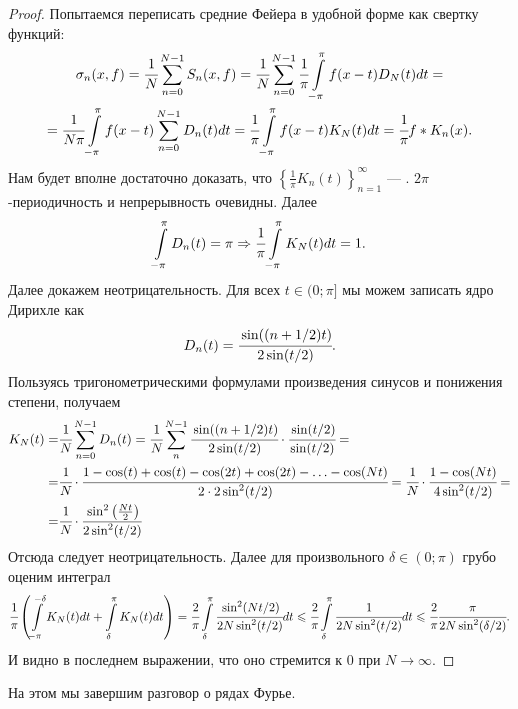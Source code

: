 	\begin{proof}
		Попытаемся переписать средние Фейера в удобной форме как свертку функций:
        \begin{multline}	
			\sigma_n(x,f) = \cfrac{1}{N}\sum\limits_{n=0}^{N-1}S_n(x,f) = \cfrac{1}{N}\sum\limits_{n=0}^{N-1}\cfrac{1}{\pi}\int\limits_{-\pi}^{\pi}f(x-t)D_N(t)dt = \\ 
            = \cfrac{1}{N\pi}\int\limits_{-\pi}^{\pi}f(x-t)\sum\limits_{n=0}^{N-1}D_n(t)dt =   \cfrac{1}{\pi}\int\limits_{-\pi}^{\pi}f(x-t)K_N(t)dt = \cfrac{1}{\pi}f*K_n(x).
        \end{multline}
		Нам будет вполне достаточно доказать, что $\left\{\frac{1}{\pi}K_n(t)\right\}_{n=1}^{\infty}$ --- \lmao. 
		$2\pi$-периодичность и непрерывность очевидны. Далее
		$$
			\int\limits_{-\pi}^{\pi}D_n(t) = \pi \Rightarrow \cfrac{1}{\pi} \int\limits_{-\pi}^{\pi}K_N(t) dt = 1.
		$$
		Далее докажем неотрицательность. Для всех $t \in (0; \pi]$ мы можем записать ядро Дирихле как
		$$
			D_n(t) = \cfrac{\sin((n + 1/2)t)}{2\sin(t/2)}.
		$$
		Пользуясь тригонометрическими формулами произведения синусов и понижения степени, получаем
		\begin{align}
			K_N(t) =& \cfrac{1}{N}\sum\limits_{n=0}^{N-1} D_n(t) = \cfrac{1}{N}\sum\limits_{n}^{N-1} \cfrac{\sin((n + 1/2)t)}{2\sin(t/2)}\cdot\cfrac{\sin(t/2)}{\sin(t/2)} = \\
			=& \cfrac{1}{N}\cdot \cfrac{1 - \cos(t) + \cos(t) - \cos(2t) + \cos(2t) - \ldots - \cos(Nt)}{2\cdot 2\sin^2(t/2)} = \cfrac{1}{N}\cdot \cfrac{1 - \cos(Nt)}{4\sin^2(t/2)} =\\
			=&\cfrac{1}{N}\cdot \cfrac{\sin^2\left(\frac{Nt}{2}\right)}{2\sin^2(t/2)}
	    \end{align}
	    Отсюда следует неотрицательность.
	    Далее для произвольного $\delta \in (0;\pi)$ грубо оценим интеграл
	    \begin{gather}
	    	\cfrac{1}{\pi}\left(\int\limits_{-\pi}^{-\delta}K_N(t)dt + \int\limits_{\delta}^{\pi}K_N(t)dt\right) = \cfrac{2}{\pi}\int\limits_{\delta}^{\pi}\cfrac{\sin^2(Nt/2)}{2N\sin^2(t/2)}dt \leqslant \cfrac{2}{\pi}\int\limits_{\delta}^{\pi} \cfrac{1}{2N\sin^2(t/2)}dt \leqslant \cfrac{2}{\pi}\cfrac{\pi}{2N \sin^2(\delta/2)}.
	    \end{gather}
	    И видно в последнем выражении, что оно стремится к 0 при $N \to \infty.$
	\end{proof}
	На этом мы завершим разговор о рядах Фурье.
